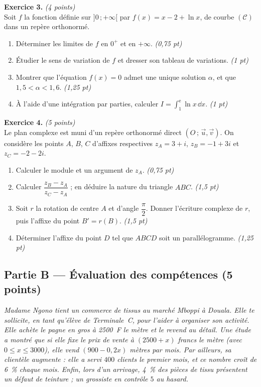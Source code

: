 \smallskip
\noindent\textbf{Exercice 3.} \hfill\textit{(4 points)}\\
Soit $f$ la fonction définie sur $]0\,;+\infty[$ par $f(x)=x-2+\ln x$, de courbe $(\mathcal{C})$
dans un repère orthonormé.
\begin{enumerate}[label=\arabic*)]
\item Déterminer les limites de $f$ en $0^+$ et en $+\infty$. \hfill\textit{(0,75 pt)}
\item Étudier le sens de variation de $f$ et dresser son tableau de variations. \hfill\textit{(1 pt)}
\item Montrer que l'équation $f(x)=0$ admet une unique solution $\alpha$, et que $1{,}5<\alpha<1{,}6$. \hfill\textit{(1,25 pt)}
\item À l'aide d'une intégration par parties, calculer $\displaystyle I=\int_1^{\mathrm{e}}\ln x\,\dd x$. \hfill\textit{(1 pt)}
\end{enumerate}

\smallskip
\noindent\textbf{Exercice 4.} \hfill\textit{(5 points)}\\
Le plan complexe est muni d'un repère orthonormé direct $(O\,;\,\vec u,\vec v)$. On considère
les points $A$, $B$, $C$ d'affixes respectives $z_A=3+i$, $z_B=-1+3i$ et $z_C=-2-2i$.
\begin{enumerate}[label=\arabic*)]
\item Calculer le module et un argument de $z_A$. \hfill\textit{(0,75 pt)}
\item Calculer $\dfrac{z_B-z_A}{z_C-z_A}$ ; en déduire la nature du triangle $ABC$. \hfill\textit{(1,5 pt)}
\item Soit $r$ la rotation de centre $A$ et d'angle $\dfrac{\pi}{2}$. Donner l'écriture complexe
de $r$, puis l'affixe du point $B'=r(B)$. \hfill\textit{(1,5 pt)}
\item Déterminer l'affixe du point $D$ tel que $ABCD$ soit un parallélogramme. \hfill\textit{(1,25 pt)}
\end{enumerate}

\subsection*{Partie B — Évaluation des compétences \hfill (5 points)}

\noindent\textit{Madame Ngono tient un commerce de tissus au marché Mboppi à Douala. Elle te
sollicite, en tant qu'élève de Terminale~C, pour l'aider à organiser son activité. Elle achète
le pagne en gros à \SI{2500}{F} le mètre et le revend au détail. Une étude a montré que si elle
fixe le prix de vente à $(2500+x)$ francs le mètre (avec $0\le x\le 3000$), elle vend
$(900-0{,}2x)$ mètres par mois. Par ailleurs, sa clientèle augmente : elle a servi $400$ clients
le premier mois, et ce nombre croît de \SI{6}{\percent} chaque mois. Enfin, lors d'un arrivage,
\SI{4}{\percent} des pièces de tissu présentent un défaut de teinture ; un grossiste en contrôle
$5$ au hasard.}

